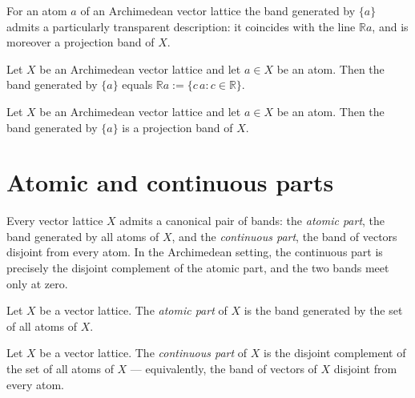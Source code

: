 For an atom $a$ of an Archimedean vector lattice the band generated
by $\{a\}$ admits a particularly transparent description: it
coincides with the line $\mathbb{R} a$, and is moreover a projection
band of $X$.

\begin{theorem}
\label{thm:principalBand-eq-smul-of-isVLAtom}
\leanok
{}
Let $X$ be an Archimedean vector lattice and let $a \in X$ be an
atom. Then the band generated by $\{a\}$ equals
$\mathbb{R} a := \{c\,a : c \in \mathbb{R}\}$.
\end{theorem}

\begin{theorem}
\label{thm:exists-projectionBand-principalBand-of-isVLAtom}
\leanok
{}
Let $X$ be an Archimedean vector lattice and let $a \in X$ be an
atom. Then the band generated by $\{a\}$ is a projection band of
$X$.
\end{theorem}

\section{Atomic and continuous parts}

Every vector lattice $X$ admits a canonical pair of bands: the
\emph{atomic part}, the band generated by all atoms of $X$, and the
\emph{continuous part}, the band of vectors disjoint from every
atom. In the Archimedean setting, the continuous part is precisely
the disjoint complement of the atomic part, and the two bands meet
only at zero.

\begin{definition}
\label{def:atomicPart}
\leanok
{}
Let $X$ be a vector lattice. The \emph{atomic part} of $X$ is the
band generated by the set of all atoms of $X$.
\end{definition}

\begin{definition}
\label{def:continuousPart}
\leanok
{}
Let $X$ be a vector lattice. The \emph{continuous part} of $X$ is
the disjoint complement of the set of all atoms of $X$ —
equivalently, the band of vectors of $X$ disjoint from every atom.
\end{definition}

